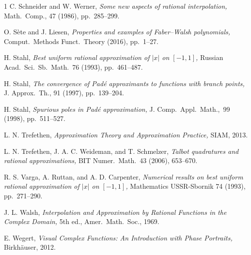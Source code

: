 \documentclass[final]{siamltex}
\begin{document}
\begin{thebibliography}{1}
{\sc C. Schneider and W. Werner,}
{\em Some new aspects of rational interpolation,}
Math.\ Comp., 47 (1986), pp.~285--299.

{\sc O. S\`ete and J. Liesen,}
{\em Properties and examples of Faber--Walsh polynomials,}
Comput.\ Methods Funct.\ Theory (2016), pp.~1--27.

{\sc H. Stahl,} {\em
Best uniform rational approximation of $|x|$ on $[-1,1]$,}
Russian Acad.\ Sci.\ Sb.\ Math.\ 76 (1993), pp.~461--487.

{\sc H. Stahl,} {\em The convergence of Pad\'e approximants
to functions with branch points,} J. Approx.\ Th., 91
(1997), pp.~139--204.

{\sc H. Stahl,} {\em Spurious poles in Pad\'e approximation,}
J. Comp.\ Appl.\ Math.,\ 99 (1998), pp.~511--527.

{\sc L. N. Trefethen,} {\em Approximation Theory and
Approximation Practice,} SIAM, 2013.

{\sc L. N. Trefethen, J. A. C. Weideman, and T. Schmelzer,}
{\em Talbot quadratures and rational approximations,}
BIT Numer.\ Math.\ 43 (2006), 653--670.

{\sc R. S. Varga, A. Ruttan, and A. D. Carpenter,} {\em Numerical results
on best uniform rational approximation of $|x|$ on
$[-1,1]$, }
Mathematics USSR-Sbornik 74 (1993), pp.~271--290.

{\sc J. L. Walsh,} {\em Interpolation and Approximation
by Rational Functions in the Complex Domain,} 5th ed., Amer.\ Math.\ Soc.,
1969.

{\sc E. Wegert,} {\em Visual Complex Functions: An Introduction with Phase Portraits,}
Birkh\"auser, 2012.

\end{thebibliography}
\end{document}
